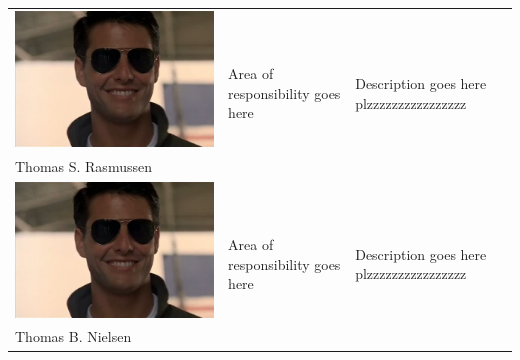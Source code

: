 \begin{tabular}[c]{|p{3cm}| p{5cm} | p{6cm}|}
	\phantom{Test}
	\includegraphics[scale=0.54]{Introduction/TeamPictures/TomC} & \multirow{2}{5cm}{Area of responsibility goes here} & \multirow{2}{6cm}{Description goes here plzzzzzzzzzzzzzzzz} \\
	Thomas S. \newline Rasmussen & & \\ \hline
	
	\phantom{Test}
	\includegraphics[scale=0.54]{Introduction/TeamPictures/TomC} & \multirow{2}{5cm}{Area of responsibility goes here} & \multirow{2}{6cm}{Description goes here plzzzzzzzzzzzzzzzz} \\
	Thomas B. \newline Nielsen & & \\ \hline
\end{tabular}